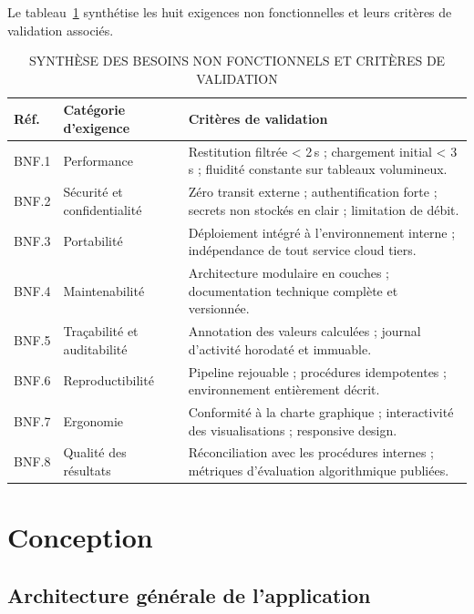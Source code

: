 \documentclass[../main.tex]{subfiles}
\begin{document}
Le tableau~\ref{tab:bnf_synthese} synthétise les huit exigences non fonctionnelles et leurs critères de validation associés.

\begin{table}[H]
\centering
\caption{SYNTHÈSE DES BESOINS NON FONCTIONNELS ET CRITÈRES DE VALIDATION}
\label{tab:bnf_synthese}
\small
\begin{tabularx}{\textwidth}{@{}p{1.1cm}p{3.2cm}X@{}}
\toprule
\textbf{Réf.} & \textbf{Catégorie d'exigence}      & \textbf{Critères de validation} \\
\midrule
BNF.1 & Performance                        & Restitution filtrée < 2\,s ; chargement initial < 3\,s ; fluidité constante sur tableaux volumineux. \\
BNF.2 & Sécurité et confidentialité        & Zéro transit externe ; authentification forte ; secrets non stockés en clair ; limitation de débit. \\
BNF.3 & Portabilité                        & Déploiement intégré à l'environnement interne ; indépendance de tout service cloud tiers. \\
BNF.4 & Maintenabilité                     & Architecture modulaire en couches ; documentation technique complète et versionnée. \\
BNF.5 & Traçabilité et auditabilité        & Annotation des valeurs calculées ; journal d'activité horodaté et immuable. \\
BNF.6 & Reproductibilité                   & Pipeline rejouable ; procédures idempotentes ; environnement entièrement décrit. \\
BNF.7 & Ergonomie                          & Conformité à la charte graphique ; interactivité des visualisations ; responsive design. \\
BNF.8 & Qualité des résultats              & Réconciliation avec les procédures internes ; métriques d'évaluation algorithmique publiées. \\
\bottomrule
\end{tabularx}
\end{table}

\section{Conception}

\subsection{Architecture générale de l'application}
\end{document}
